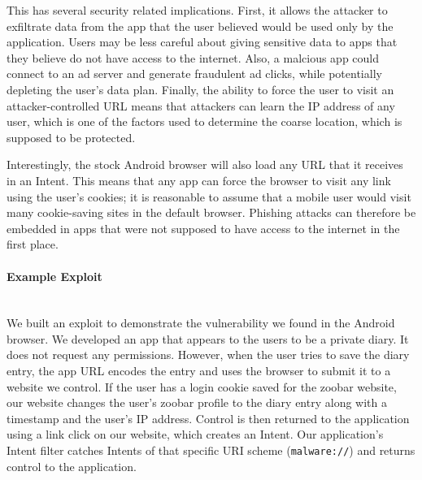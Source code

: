 \documentclass[12pt,a4paper]{article}
\begin{document}
This has several security related implications. First, it allows the attacker to
exfiltrate data from the app that the user believed would be used only by the
application. Users may be less careful about giving sensitive data to apps that
they believe do not have access to the internet.  Also, a malcious app could
connect to an ad server and generate fraudulent ad clicks, while potentially
depleting the user's data plan.  Finally, the ability to force the user to visit
an attacker-controlled URL means that attackers can learn the IP address of any
user, which is one of the factors used to determine the coarse location, which
is supposed to be protected.

Interestingly, the stock Android browser will also load any URL that it receives
in an Intent. This means that any app can force the browser to visit any link
using the user's cookies; it is reasonable to assume that a mobile user would
visit many cookie-saving sites in the default browser. Phishing attacks can
therefore be embedded in apps that were not supposed to have access to the
internet in the first place.

\paragraph{Example Exploit} ~\\
We built an exploit to demonstrate the vulnerability we found in the Android
browser. We developed an app that appears to the users to be a private diary. It
does not request any permissions. However, when the user tries to save the diary
entry, the app URL encodes the entry and uses the browser to submit it to a
website we control. If the user has a login cookie saved for the zoobar website,
our website changes the user's zoobar profile to the diary entry along with a
timestamp and the user's IP address. Control is then returned to the application
using a link click on our website, which creates an Intent. Our application's
Intent filter catches Intents of that specific URI scheme (\texttt{malware://})
and returns control to the application.
\end{document}

